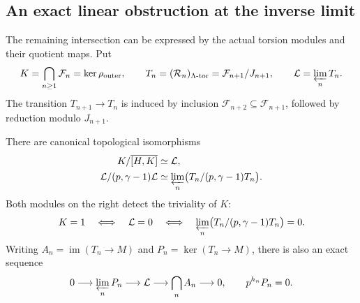 \subsection{An exact linear obstruction at the inverse limit}
\label{sec:limit-relation-module}

The remaining intersection can be expressed by the actual
torsion modules and their quotient maps. Put
\[
 K=\bigcap_{n\geq1}\mathcal F_n=\ker\rho_{\mathrm{outer}},\qquad
 T_n=(\mathcal R_n)_{\Lambda\text{-tor}}
       =\mathcal F_{n+1}/J_{n+1},\qquad
 \mathcal L=\varprojlim_nT_n.
\]
The transition \(T_{n+1}\to T_n\) is induced by inclusion
\(\mathcal F_{n+2}\subseteq \mathcal F_{n+1}\), followed by reduction modulo
\(J_{n+1}\).

\begin{proposition}\label{prop:limit-relation-module}
There are canonical topological isomorphisms
\begin{align}
 K/\overline{[H,K]}&\simeq\mathcal L,
 \label{eq:limit-relation-iso}\\
 \mathcal L/(p,\gamma-1)\mathcal L
 &\simeq
 \varprojlim_n\bigl(T_n/(p,\gamma-1)T_n\bigr).
 \label{eq:limit-mod-p-iso}
\end{align}
Both modules on the right detect the triviality of \(K\):
\begin{equation}\label{eq:limit-linear-obstruction}
 K=1\quad\Longleftrightarrow\quad
 \mathcal L=0\quad\Longleftrightarrow\quad
 \varprojlim_n\bigl(T_n/(p,\gamma-1)T_n\bigr)=0.
\end{equation}
Writing \(A_n=\operatorname{im}(T_n\to M)\) and
\(P_n=\ker(T_n\to M)\), there is also an exact sequence
\begin{equation}\label{eq:limit-abelian-torsion}
 0\longrightarrow\varprojlim_nP_n
 \longrightarrow\mathcal L
 \longrightarrow\bigcap_nA_n
 \longrightarrow0,
 \qquad p^{h_n}P_n=0.
\end{equation}
\end{proposition}

